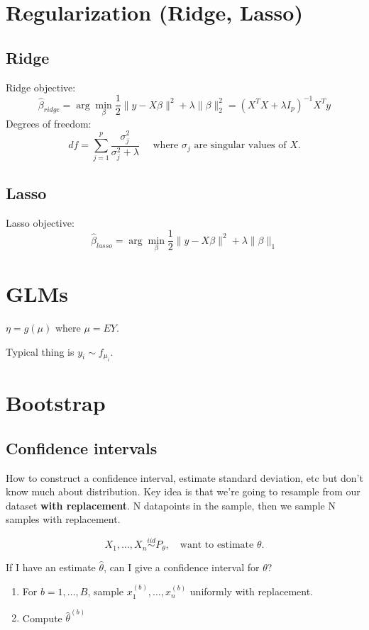 \documentclass{article}
\newcommand{\simiid}{\overset{iid}\sim }
\begin{document}
\section{Regularization (Ridge, Lasso)}
\subsection{Ridge}
Ridge objective:
$$\hat \beta_{ridge} = \arg \min _\beta \frac{1}{2} \|y - X\beta\|^2 + \lambda \|\beta\|_2^2 = (X^TX + \lambda I_p )^{-1}X^T y $$
Degrees of freedom:
$$df = \sum_{j=1}^p \frac{\sigma^2_j}{\sigma^2_j + \lambda} \quad \text{ where } \sigma_j \text{ are singular values of } X.$$  
\subsection{Lasso}

Lasso objective: 
$$\hat \beta_{lasso} = \arg \min _\beta \frac{1}{2} \|y - X\beta\|^2 + \lambda \|\beta\|_1$$ 

\newpage

\section{GLMs}

$\eta = g(\mu)$ where $\mu = EY$. 


Typical thing is $y_i \sim f_{\mu_i}$. 



\section{Bootstrap}
\subsection{Confidence intervals}
How to construct a confidence interval, estimate standard deviation, etc but don't know much about distribution. Key idea is that we're going to resample from our dataset \textbf{with replacement}. N datapoints in the sample, then we sample N samples with replacement. 

$$X_1,\ldots, X_n \simiid P_\theta, \quad \text {want to estimate } \theta.$$

If I have an estimate $\hat \theta$, can I give a confidence interval for $\theta$? 

\begin{enumerate}
	\item For $b=1,\ldots, B$, sample $x_1^{(b)},\ldots, x_{n}^{(b)}$ uniformly with replacement.
	\item Compute $\hat \theta^{(b)}$ 
\end{enumerate}
\end{document}
